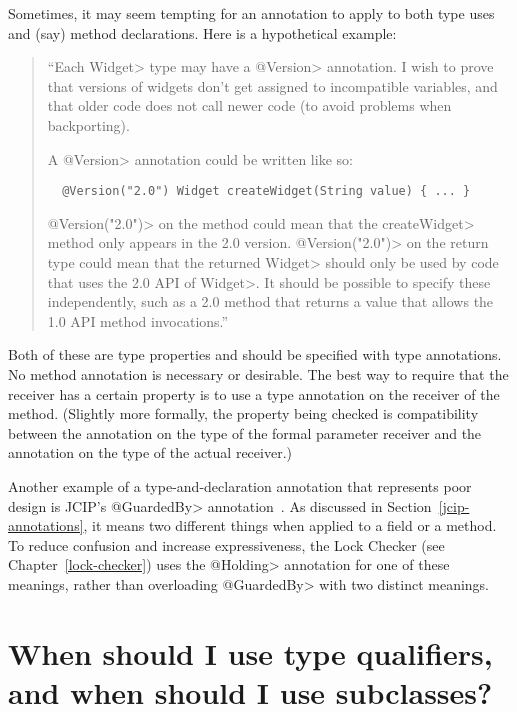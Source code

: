 Sometimes, it may seem tempting for an annotation to apply to both type
uses and (say) method declarations.  Here is a hypothetical example:

\begin{quote}
  ``Each \<Widget> type may have a \<@Version> annotation.
  I wish to prove that versions of widgets don't get assigned to
  incompatible variables, and that older code does not call newer code (to
  avoid problems when backporting).

  A \<@Version> annotation could be written like so:

\begin{Verbatim}
  @Version("2.0") Widget createWidget(String value) { ... }
\end{Verbatim}

\<@Version("2.0")> on the method could mean that the \<createWidget> method
only appears in the 2.0 version.  \<@Version("2.0")> on the return type
could mean that the returned \<Widget> should only be used by code that
uses the 2.0 API of \<Widget>.  It should be possible to specify these
independently, such as a 2.0 method that returns a value that allows the
1.0 API method invocations.''
\end{quote}

Both of these are type properties and should be specified with type
annotations.  No method annotation is necessary or desirable.  The best way
to require that the receiver has a certain property is to use a type
annotation on the receiver of the method.  (Slightly more formally, the
property being checked is compatibility between the annotation on the type
of the formal parameter receiver and the annotation on the type of the
actual receiver.)


Another example of a type-and-declaration annotation that represents poor
design is JCIP's \<@GuardedBy> annotation~\cite{Goetz2006}.  As discussed
in Section~\ref{jcip-annotations}, it means two different things when
applied to a field or a method.  To reduce confusion and increase
expressiveness, the Lock Checker (see Chapter~\ref{lock-checker}) uses the
\<@Holding> annotation for one of these meanings, rather than overloading
\<@GuardedBy> with two distinct meanings.



\section{When should I use type qualifiers, and when should I use subclasses?\label{faq-qualifiers-vs-subclasses}}

